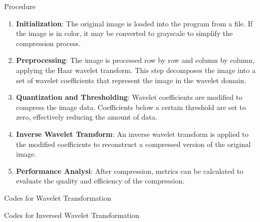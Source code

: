 \documentclass{beamer}
\begin{document}
\begin{frame}{Procedure}
	\begin{enumerate}
		\item \textbf{Initialization}: The original image is loaded into the program from a file. If the image is in color, it may be converted to grayscale to simplify the compression process.
		\item \textbf{Preprocessing}: The image is processed row by row and column by column, applying the Haar wavelet transform. This step decomposes the image into a set of wavelet coefficients that represent the image in the wavelet domain.
		\item \textbf{Quantization and Thresholding}: Wavelet coefficients are modified to compress the image data. Coefficients below a certain threshold are set to zero, effectively reducing the amount of data.
		\item \textbf{Inverse Wavelet Transform}: An inverse wavelet transform is applied to the modified coefficients to reconstruct a compressed version of the original image.
		\item \textbf{Performance Analysi}: After compression, metrics can be calculated to evaluate the quality and efficiency of the compression.
	\end{enumerate}
\end{frame}





\begin{frame}[fragile]{Codes for Wavelet Transformation}
	
\end{frame}

\begin{frame}[fragile]{Codes for Inversed Wavelet Transformation}
	
\end{frame}
\end{document}
